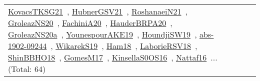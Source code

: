 {\begin{longtable}{lp{3cm}>{\raggedright\arraybackslash}p{6cm}>{\raggedright\arraybackslash}p{6cm}>{\raggedright\arraybackslash}p{8cm}}
\href{../works/KovacsTKSG21.pdf}{KovacsTKSG21}~\cite{KovacsTKSG21}, \href{../works/HubnerGSV21.pdf}{HubnerGSV21}~\cite{HubnerGSV21}, \href{../works/RoshanaeiN21.pdf}{RoshanaeiN21}~\cite{RoshanaeiN21}, \href{../works/GroleazNS20.pdf}{GroleazNS20}~\cite{GroleazNS20}, \href{../works/FachiniA20.pdf}{FachiniA20}~\cite{FachiniA20}, \href{../works/HauderBRPA20.pdf}{HauderBRPA20}~\cite{HauderBRPA20}, \href{../works/GroleazNS20a.pdf}{GroleazNS20a}~\cite{GroleazNS20a}, \href{../works/YounespourAKE19.pdf}{YounespourAKE19}~\cite{YounespourAKE19}, \href{../works/HoundjiSW19.pdf}{HoundjiSW19}~\cite{HoundjiSW19}, \href{../works/abs-1902-09244.pdf}{abs-1902-09244}~\cite{abs-1902-09244}, \href{../works/WikarekS19.pdf}{WikarekS19}~\cite{WikarekS19}, \href{../works/Ham18.pdf}{Ham18}~\cite{Ham18}, \href{../works/LaborieRSV18.pdf}{LaborieRSV18}~\cite{LaborieRSV18}, \href{../works/ShinBBHO18.pdf}{ShinBBHO18}~\cite{ShinBBHO18}, \href{../works/GomesM17.pdf}{GomesM17}~\cite{GomesM17}, \href{../works/KinsellaS0OS16.pdf}{KinsellaS0OS16}~\cite{KinsellaS0OS16}, \href{../works/Nattaf16.pdf}{Nattaf16}~\cite{Nattaf16}... (Total: 64)\\

\end{longtable}}
